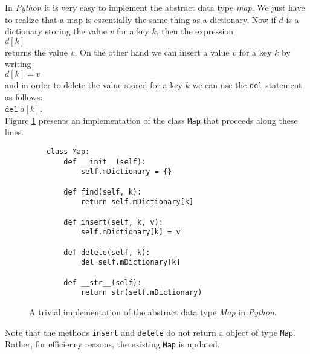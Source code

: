 In \textsl{Python} it is very easy to implement the abstract data type  \textsl{map}.  We just have
to realize that a map is essentially the same thing as a dictionary.
Now if $d$ is a dictionary storing the value $v$ for a key $k$, then the expression
\\[0.2cm]
\hspace*{1.3cm} $d[k]$
\\[0.2cm]
returns the value $v$.  On the other hand we can insert a value $v$ for a key $k$ by
writing
\\[0.2cm]
\hspace*{1.3cm}
$d[k] = v$ 
\\[0.2cm]
and in order to delete the value stored for a key  $k$ we can use the \texttt{del} statement
as follows: \\[0.2cm]
\hspace*{1.3cm} $\texttt{del}\ d[k]$. \\[0.2cm]
Figure  \ref{fig:Map-Trivial.ipynb} presents an implementation of the class \texttt{Map} that proceeds along
these lines.


\begin{figure}[!ht]
  \centering
\begin{verbatim}
    class Map:
        def __init__(self):
            self.mDictionary = {}
        
        def find(self, k):
            return self.mDictionary[k]
        
        def insert(self, k, v):
            self.mDictionary[k] = v
            
        def delete(self, k):
            del self.mDictionary[k]
            
        def __str__(self):
            return str(self.mDictionary)
\end{verbatim}
\vspace*{-0.3cm}
  \caption{A trivial implementation of the abstract data type \textsl{Map} in \textsl{Python}.}
  \label{fig:Map-Trivial.ipynb}
\end{figure} 
Note that the methods \texttt{insert} and \texttt{delete} do not return a object of type \texttt{Map}.  Rather, for
efficiency reasons, the existing \texttt{Map} is updated.


